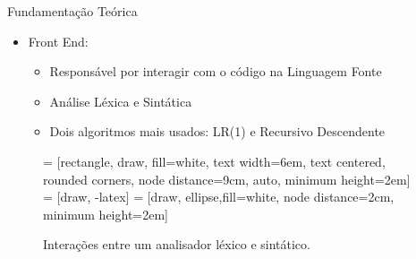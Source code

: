 \begin{frame}{Fundamentação Teórica}
    \begin{itemize}
        \item Front End:

        \begin{itemize}
            \item Responsável por interagir com o código na Linguagem Fonte
            \item Análise Léxica e Sintática
            \item Dois algoritmos mais usados: LR(1) e Recursivo Descendente
        \end{itemize}
        
    \end{itemize}
\begin{figure}
 = [rectangle, draw, fill=white,
    text width=6em, text centered, rounded corners, node distance=9cm, auto, minimum height=2em]
 = [draw, -latex]
 = [draw, ellipse,fill=white, node distance=2cm,
    minimum height=2em]

\begin{center}
\end{center}

\caption{Interações entre um analisador léxico e sintático.}
\label{fig:lexico_sintatico}
\end{figure}

\end{frame}


